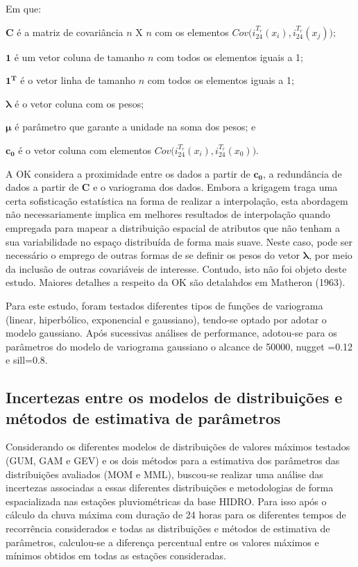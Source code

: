 \documentclass[
]{agujournal2019}
\begin{document}
Em que:

\(\mathbf{C}\) é a matriz de covariância \(n\) X \(n\) com os elementos
\(Cov\bigg(i_{24}^{T_r}(x_i), i_{24}^{T_r}(x_j)\bigg)\);

\(\mathbf{1}\) é um vetor coluna de tamanho \(n\) com todos os elementos
iguais a 1;

\(\mathbf{1^T}\) é o vetor linha de tamanho \(n\) com todos os elementos
iguais a 1;

\(\mathbf{\lambda}\) é o vetor coluna com os pesos;

\(\mathbf{\mu}\) é parâmetro que garante a unidade na soma dos pesos; e

\(\mathbf{c_0}\) é o vetor coluna com elementos
\(Cov\bigg(i_{24}^{T_r}(x_i), i_{24}^{T_r}(x_0)\bigg)\).

A OK considera a proximidade entre os dados a partir de
\(\mathbf{c_0}\), a redundância de dados a partir de \(\mathbf{C}\) e o
variograma dos dados. Embora a krigagem traga uma certa sofisticação
estatística na forma de realizar a interpolação, esta abordagem não
necessariamente implica em melhores resultados de interpolação quando
empregada para mapear a distribuição espacial de atributos que não
tenham a sua variabilidade no espaço distribuída de forma mais suave.
Neste caso, pode ser necessário o emprego de outras formas de se definir
os pesos do vetor \(\mathbf{\lambda}\), por meio da inclusão de outras
covariáveis de interesse. Contudo, isto não foi objeto deste estudo.
Maiores detalhes a respeito da OK são detalahdos em Matheron (1963).

Para este estudo, foram testados diferentes tipos de funções de
variograma (linear, hiperbólico, exponencial e gaussiano), tendo-se
optado por adotar o modelo gaussiano. Após sucessivas análises de
performance, adotou-se para os parâmetros do modelo de variograma
gaussiano o alcance de 50000, nugget =0.12 e sill=0.8.

\subsection{Incertezas entre os modelos de distribuições e métodos de
estimativa de
parâmetros}\label{incertezas-entre-os-modelos-de-distribuiuxe7uxf5es-e-muxe9todos-de-estimativa-de-paruxe2metros}

Considerando os diferentes modelos de distribuições de valores máximos
testados (GUM, GAM e GEV) e os dois métodos para a estimativa dos
parâmetros das distribuições avaliados (MOM e MML), buscou-se realizar
uma análise das incertezas associadas a essas diferentes distribuições e
metodologias de forma espacializada nas estações pluviométricas da base
HIDRO. Para isso após o cálculo da chuva máxima com duração de 24 horas
para os diferentes tempos de recorrência considerados e todas as
distribuições e métodos de estimativa de parâmetros, calculou-se a
diferença percentual entre os valores máximos e mínimos obtidos em todas
as estações consideradas.
\end{document}
